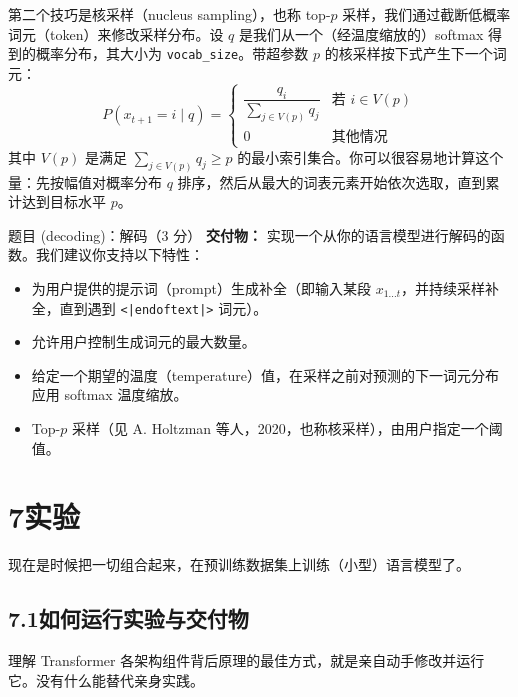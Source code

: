 
第二个技巧是核采样（nucleus sampling），也称 top-$p$ 采样，我们通过截断低概率词元（token）来修改采样分布。设 $q$ 是我们从一个（经温度缩放的）softmax 得到的概率分布，其大小为 \texttt{vocab\_size}。带超参数 $p$ 的核采样按下式产生下一个词元：
\begin{equation*}
P(x_{t+1} = i \mid q) =
\begin{cases}
\dfrac{q_i}{\sum_{j \in V(p)} q_j} & \text{若 } i \in V(p) \\[2mm]
0 & \text{其他情况}
\end{cases}
\tag{24}
\end{equation*}
其中 $V(p)$ 是满足 $\sum_{j \in V(p)} q_j \ge p$ 的最小索引集合。你可以很容易地计算这个量：先按幅值对概率分布 $q$ 排序，然后从最大的词表元素开始依次选取，直到累计达到目标水平 $p$。

\begin{problembox}{题目 (decoding)：解码（3 分）}
\textbf{交付物：} 实现一个从你的语言模型进行解码的函数。我们建议你支持以下特性：
\begin{itemize}
  \item 为用户提供的提示词（prompt）生成补全（即输入某段 $x_{1\dots t}$，并持续采样补全，直到遇到 \texttt{<|endoftext|>} 词元）。
  \item 允许用户控制生成词元的最大数量。
  \item 给定一个期望的温度（temperature）值，在采样之前对预测的下一词元分布应用 softmax 温度缩放。
  \item Top-$p$ 采样（见 A. Holtzman 等人，2020，也称核采样），由用户指定一个阈值。
\end{itemize}
\end{problembox}

\section*{7\quad 实验}
现在是时候把一切组合起来，在预训练数据集上训练（小型）语言模型了。

\subsection*{7.1\quad 如何运行实验与交付物}
理解 Transformer 各架构组件背后原理的最佳方式，就是亲自动手修改并运行它。没有什么能替代亲身实践。

